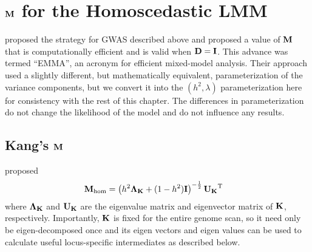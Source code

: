 




\section{\texorpdfstring{$\mathbf{M}$}{M} for the Homoscedastic LMM}

\citet{Kang2008} proposed the strategy for GWAS described above and proposed a value of $\mathbf{M}$ that is computationally efficient and is valid when $\mathbf{D} = \mathbf{I}$.
This advance was termed ``EMMA'', an acronym for efficient mixed-model analysis.
Their approach used a slightly different, but mathematically equivalent, parameterization of the variance components, but we convert it into the $(h^2, \lambda)$ parameterization here for consistency with the rest of this chapter.
The differences in parameterization do not change the likelihood of the model and do not influence any results.

\subsection{Kang's \texorpdfstring{$\mathbf{M}$}{M}}
\citet{Kang2008} proposed
\begin{align}
  \mathbf{M}_\text{hom} &= \left( h^2\mathbf{\Lambda_K} + (1-h^2)\mathbf{I} \right)^{-\frac{1}{2}} \mathbf{U_K} ^\mathrm{T}
\end{align}
where $\mathbf{\Lambda_K}$ and $\mathbf{U_K}$ are the eigenvalue matrix and eigenvector matrix of $\mathbf{K}$, respectively.
Importantly, $\mathbf{K}$ is fixed for the entire genome scan, so it need only be eigen-decomposed once and its eigen vectors and eigen values can be used to calculate useful locus-specific intermediates as described below.

